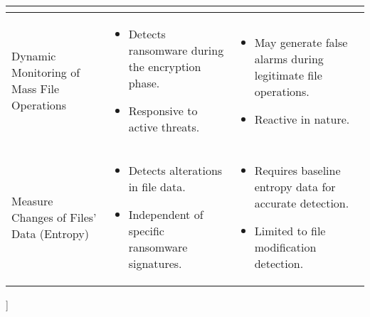 \documentclass{article}
\begin{document}
\begin{center}
\begin{table}[htbp]
\begin{tabular}{|p{4cm}|p{4.5cm}|p{4.5cm}|}
\begin{itemize}[leftmargin=*, nosep]
    \end{itemize} \\
    \hline
    Dynamic Monitoring of Mass File Operations & 
    \begin{itemize}[leftmargin=*, nosep]
        \item Detects ransomware during the encryption phase.
        \item Responsive to active threats.
    \end{itemize} &
    \begin{itemize}[leftmargin=*, nosep]
        \item May generate false alarms during legitimate file operations.
        \item Reactive in nature.
    \end{itemize} \\
    \hline
    Measure Changes of Files’ Data (Entropy) & 
    \begin{itemize}[leftmargin=*, nosep]
        \item Detects alterations in file data.
        \item Independent of specific ransomware signatures.
    \end{itemize} &
    \begin{itemize}[leftmargin=*, nosep]
        \item Requires baseline entropy data for accurate detection.
        \item Limited to file modification detection.
    \end{itemize} \\
    \hline
    \end{tabular}
\end{table}
]
    
\end{center}
\end{document}
